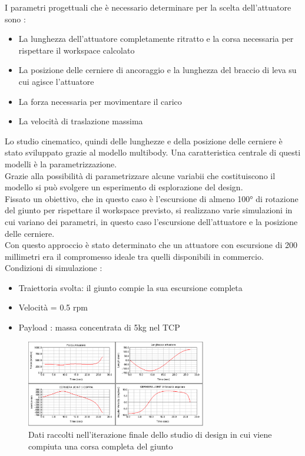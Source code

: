\documentclass[%
corpo=11pt,
twoside,
 stile=classica,
oldstyle,
greek,%
]{toptesi}
\begin{document}
	I parametri progettuali che è necessario determinare per la scelta dell'attuatore sono :
	\begin{itemize}
		\item La lunghezza dell'attuatore completamente ritratto e la corsa necessaria per rispettare il workspace calcolato
		\item La posizione delle cerniere di ancoraggio e la lunghezza del braccio di leva su cui agisce l'attuatore
		\item La forza necessaria per movimentare il carico 
		\item La velocità di traslazione massima 
	\end{itemize}
	
	Lo studio cinematico, quindi delle lunghezze e della posizione delle cerniere è stato sviluppato grazie al modello multibody. Una caratteristica centrale di questi modelli è la parametrizzazione.\\
	 Grazie alla possibilità di parametrizzare alcune variabii che costituiscono il modello si può svolgere un esperimento di esplorazione del design. \\
	Fissato un obiettivo, che in questo caso è l'escursione di almeno 100° di rotazione del giunto per rispettare il workspace previsto, si realizzano varie simulazioni in cui variano dei parametri, in questo caso l'escursione dell'attuatore e la posizione delle cerniere. \\
	Con questo approccio è stato determinato che un attuatore con escursione di 200 millimetri era il compromesso ideale tra quelli disponibili in commercio. 
		Condizioni di simulazione :
	\begin{itemize}
		\item Traiettoria svolta: il giunto compie la sua escursione completa
		\item Velocità = 0.5 rpm 
		\item Payload : massa concentrata di 5kg nel TCP 
	\end{itemize}
	\begin{figure}
		\centering
		\includegraphics[width=0.7\textwidth]{Plots/GOMITO/Joint3.png}
		\caption{Dati raccolti nell'iterazione finale dello studio di design in cui viene compiuta una corsa completa del giunto }
		\label{fig:MBDLinear}
	\end{figure}
\end{document}
